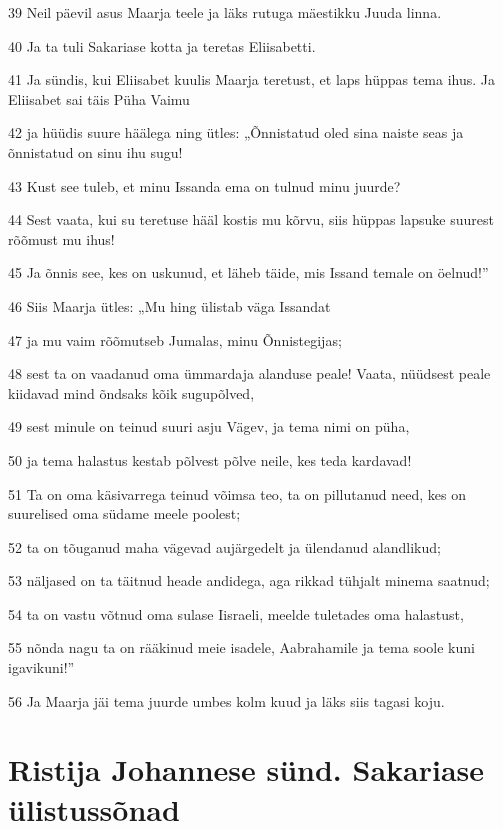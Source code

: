\par 39 Neil päevil asus Maarja teele ja läks rutuga mäestikku Juuda linna.
\par 40 Ja ta tuli Sakariase kotta ja teretas Eliisabetti.
\par 41 Ja sündis, kui Eliisabet kuulis Maarja teretust, et laps hüppas tema ihus. Ja Eliisabet sai täis Püha Vaimu
\par 42 ja hüüdis suure häälega ning ütles: „Õnnistatud oled sina naiste seas ja õnnistatud on sinu ihu sugu!
\par 43 Kust see tuleb, et minu Issanda ema on tulnud minu juurde?
\par 44 Sest vaata, kui su teretuse hääl kostis mu kõrvu, siis hüppas lapsuke suurest rõõmust mu ihus!
\par 45 Ja õnnis see, kes on uskunud, et läheb täide, mis Issand temale on öelnud!”
\par 46 Siis Maarja ütles: „Mu hing ülistab väga Issandat
\par 47 ja mu vaim rõõmutseb Jumalas, minu Õnnistegijas;
\par 48 sest ta on vaadanud oma ümmardaja alanduse peale! Vaata, nüüdsest peale kiidavad mind õndsaks kõik sugupõlved,
\par 49 sest minule on teinud suuri asju Vägev, ja tema nimi on püha,
\par 50 ja tema halastus kestab põlvest põlve neile, kes teda kardavad!
\par 51 Ta on oma käsivarrega teinud võimsa teo, ta on pillutanud need, kes on suurelised oma südame meele poolest;
\par 52 ta on tõuganud maha vägevad aujärgedelt ja ülendanud alandlikud;
\par 53 näljased on ta täitnud heade andidega, aga rikkad tühjalt minema saatnud;
\par 54 ta on vastu võtnud oma sulase Iisraeli, meelde tuletades oma halastust,
\par 55 nõnda nagu ta on rääkinud meie isadele, Aabrahamile ja tema soole kuni igavikuni!”
\par 56 Ja Maarja jäi tema juurde umbes kolm kuud ja läks siis tagasi koju.

\section*{Ristija Johannese sünd. Sakariase ülistussõnad}

